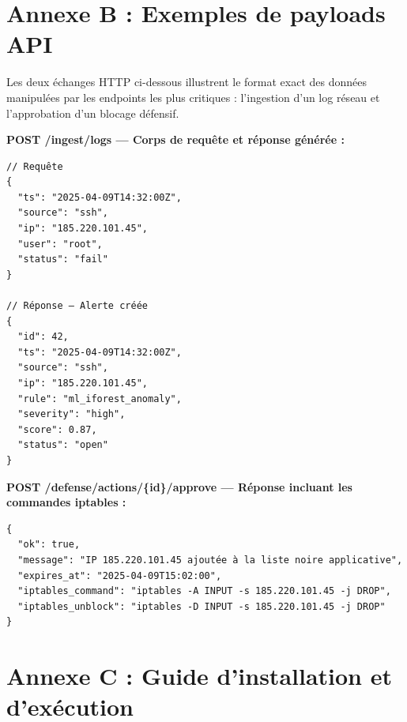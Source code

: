 \documentclass[12pt,a4paper]{report}
\begin{document}
\section*{Annexe B : Exemples de payloads API}

Les deux échanges HTTP ci-dessous illustrent le format exact des données
manipulées par les endpoints les plus critiques : l'ingestion d'un log réseau
et l'approbation d'un blocage défensif.

\textbf{POST /ingest/logs — Corps de requête et réponse générée :}

\begin{tcolorbox}[colback=lightblue, colframe=darkblue, arc=5pt]
\begin{small}
\begin{verbatim}
// Requête
{
  "ts": "2025-04-09T14:32:00Z",
  "source": "ssh",
  "ip": "185.220.101.45",
  "user": "root",
  "status": "fail"
}

// Réponse — Alerte créée
{
  "id": 42,
  "ts": "2025-04-09T14:32:00Z",
  "source": "ssh",
  "ip": "185.220.101.45",
  "rule": "ml_iforest_anomaly",
  "severity": "high",
  "score": 0.87,
  "status": "open"
}
\end{verbatim}
\end{small}
\end{tcolorbox}

\textbf{POST /defense/actions/\{id\}/approve — Réponse incluant les commandes iptables :}

\begin{tcolorbox}[colback=lightblue, colframe=darkblue, arc=5pt]
\begin{small}
\begin{verbatim}
{
  "ok": true,
  "message": "IP 185.220.101.45 ajoutée à la liste noire applicative",
  "expires_at": "2025-04-09T15:02:00",
  "iptables_command": "iptables -A INPUT -s 185.220.101.45 -j DROP",
  "iptables_unblock": "iptables -D INPUT -s 185.220.101.45 -j DROP"
}
\end{verbatim}
\end{small}
\end{tcolorbox}
\newpage

\section*{Annexe C : Guide d'installation et d'exécution}
\end{document}
